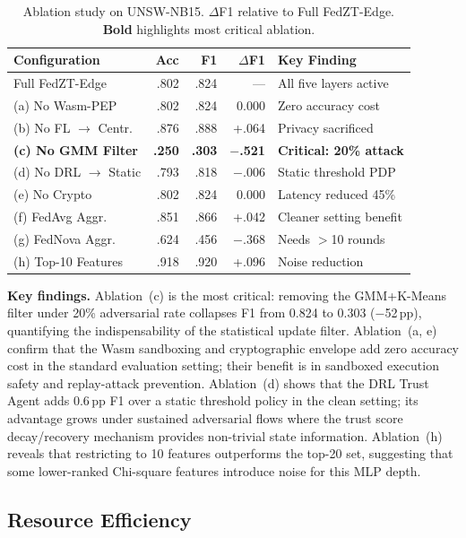 \documentclass[11pt,a4paper,twocolumn]{article}
\theoremstyle{definition}
\begin{document}
\begin{table}[htbp]
\caption{Ablation study on UNSW-NB15.  $\Delta$F1 relative to Full
  FedZT-Edge.  \textbf{Bold} highlights most critical ablation.}
\label{tab:ablations}
\centering\scriptsize
\setlength{\tabcolsep}{4pt}
\begin{tabular}{@{}L{2.6cm}rrrl@{}}
\toprule
\textbf{Configuration} & Acc & F1 & $\Delta$F1 & Key Finding \\
\midrule
Full FedZT-Edge        & .802 & .824 & --- & All five layers active \\
(a) No Wasm-PEP        & .802 & .824 & 0.000 & Zero accuracy cost \\
(b) No FL $\to$ Centr. & .876 & .888 & +.064 & Privacy sacrificed \\
\textbf{(c) No GMM Filter} & \textbf{.250} & \textbf{.303} & \textbf{$-$.521} & \textbf{Critical: 20\% attack} \\
(d) No DRL $\to$ Static & .793 & .818 & $-$.006 & Static threshold PDP \\
(e) No Crypto          & .802 & .824 & 0.000 & Latency reduced 45\% \\
(f) FedAvg Aggr.       & .851 & .866 & +.042 & Cleaner setting benefit \\
(g) FedNova Aggr.      & .624 & .456 & $-$.368 & Needs $>$10 rounds \\
(h) Top-10 Features    & .918 & .920 & +.096 & Noise reduction \\
\bottomrule
\end{tabular}
\end{table}

\textbf{Key findings.}
Ablation~(c) is the most critical: removing the GMM+K-Means filter under
20\% adversarial rate collapses F1 from 0.824 to 0.303 ($-$52\,pp),
quantifying the indispensability of the statistical update filter.
Ablation~(a, e) confirm that the Wasm sandboxing and cryptographic envelope
add zero accuracy cost in the standard evaluation setting; their benefit
is in sandboxed execution safety and replay-attack prevention.
Ablation~(d) shows that the DRL Trust Agent adds 0.6\,pp F1 over a
static threshold policy in the clean setting; its advantage grows under
sustained adversarial flows where the trust score decay/recovery mechanism
provides non-trivial state information.
Ablation~(h) reveals that restricting to 10 features outperforms the
top-20 set, suggesting that some lower-ranked Chi-square features
introduce noise for this MLP depth.

\subsection{Resource Efficiency}
\label{sec:resources}
\end{document}
